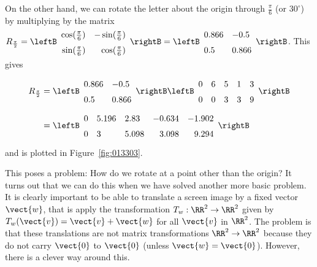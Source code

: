 On the other hand, we can rotate the letter about the origin through $\frac{\pi}{6}$ (or $30^\circ$) by multiplying by the matrix  $R_{\frac{\pi}{2}} = \leftB
\def\arraystretch{1.5}\begin{array}{rr}
\cos(\frac{\pi}{6}) & -\sin(\frac{\pi}{6})\\
\sin(\frac{\pi}{6}) & \cos(\frac{\pi}{6})
\end{array}
\rightB = \leftB
\begin{array}{ll}
0.866 & -0.5\\
0.5 & 0.866
\end{array}
\rightB$.
This gives
\begin{align*}
R_{\frac{\pi}{2}} &= \leftB
\begin{array}{ll}
0.866 & -0.5\\
0.5 & 0.866
\end{array}
\rightB \leftB
\begin{array}{rrrrr}
0 & 6 & 5 & 1 & 3\\
0 & 0 & 3 & 3 & 9
\end{array}
\rightB \\ &=
\leftB
\begin{array}{lllrr}
0 & 5.196 & 2.83 & -0.634 & -1.902\\
0 & 3 & 5.098 & 3.098 & 9.294
\end{array}
\rightB
\end{align*}
and is plotted in Figure~\ref{fig:013303}.

This poses a problem: How do we rotate  at a point other than the origin? It turns out that we can do this when  we have solved another more basic problem. It is clearly important to be  able to translate a screen image by a fixed vector $\vect{w}$, that is apply the transformation $T_{w} : \RR^2 \to \RR^2$ given by $T_{w}(\vect{v}) = \vect{v} + \vect{w}$ for all $\vect{v}$ in $\RR^2$. The problem is that these translations are not matrix transformations $\RR^2 \to \RR^2$ because they do not carry $\vect{0}$ to $\vect{0}$ (unless $\vect{w} = \vect{0}$). However, there is a clever way around this.

